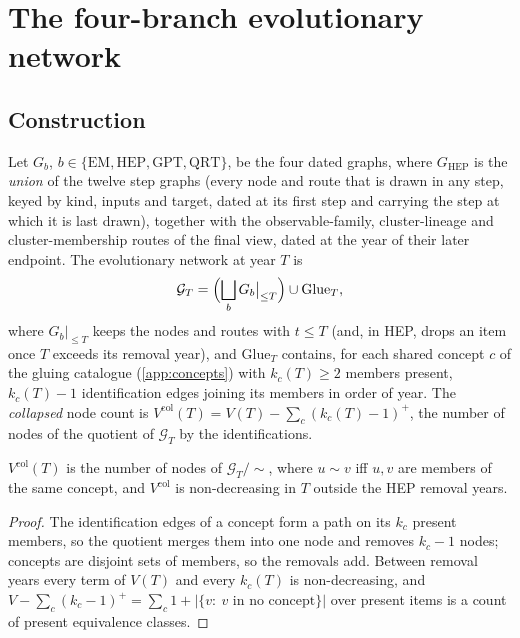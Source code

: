 \begin{table}[htbp]\centering\small
\caption{Polarity of the first incident route of each node, by layer and branch (a node whose first routes have several polarities is counted under their combination; \emph{isolated} = no route).}\label{tab:evo_first_polarity}

\end{table}

\chapter{The four-branch evolutionary network}\label{ch:merged}

\section{Construction}
\begin{definition}\label{def:merged}
Let $G_b$, $b\in\{\mathrm{EM},\mathrm{HEP},\mathrm{GPT},\mathrm{QRT}\}$, be the four dated graphs, where $G_{\mathrm{HEP}}$ is the \emph{union} of the twelve step graphs (every node and route that is drawn in any step, keyed by kind, inputs and target, dated at its first step and carrying the step at which it is last drawn), together with the observable-family, cluster-lineage and cluster-membership routes of the final view, dated at the year of their later endpoint. The evolutionary network at year $T$ is
\[ \mathcal G_T=\Bigl(\bigsqcup_b G_b\big|_{\le T}\Bigr)\cup\mathrm{Glue}_T, \]
where $G_b|_{\le T}$ keeps the nodes and routes with $t\le T$ (and, in HEP, drops an item once $T$ exceeds its removal year), and $\mathrm{Glue}_T$ contains, for each shared concept $c$ of the gluing catalogue (\cref{app:concepts}) with $k_c(T)\ge2$ members present, $k_c(T)-1$ identification edges joining its members in order of year. The \emph{collapsed} node count is $V^{\mathrm{col}}(T)=V(T)-\sum_c (k_c(T)-1)^+$, the number of nodes of the quotient of $\mathcal G_T$ by the identifications.
\end{definition}
\begin{lemma}\label{lem:collapse}
$V^{\mathrm{col}}(T)$ is the number of nodes of $\mathcal G_T/\!\sim$, where $u\sim v$ iff $u,v$ are members of the same concept, and $V^{\mathrm{col}}$ is non-decreasing in $T$ outside the HEP removal years.
\end{lemma}
\begin{proof}
The identification edges of a concept form a path on its $k_c$ present members, so the quotient merges them into one node and removes $k_c-1$ nodes; concepts are disjoint sets of members, so the removals add. Between removal years every term of $V(T)$ and every $k_c(T)$ is non-decreasing, and $V-\sum_c(k_c-1)^+=\sum_c 1+|\{v:\ v\text{ in no concept}\}|$ over present items is a count of present equivalence classes.
\end{proof}

